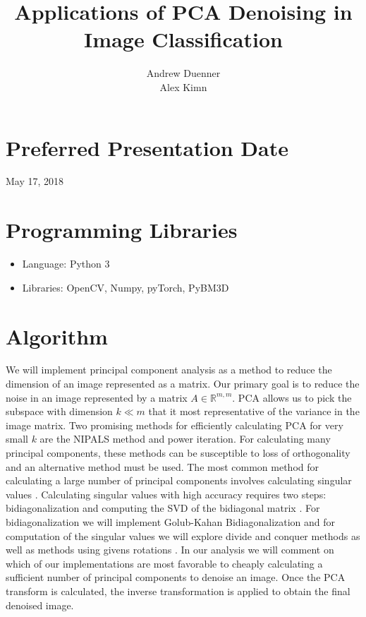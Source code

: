 \documentclass[11pt]{article} %
\title{Applications of PCA Denoising in Image Classification}
\author{Andrew Duenner \\ Alex Kimn}
\begin{document}
\maketitle

\section*{Preferred Presentation Date}
May 17, 2018
\section*{Programming Libraries}
\begin{itemize}
  \item Language: Python 3
  \item Libraries: OpenCV, Numpy, pyTorch, PyBM3D
\end{itemize}

\section*{Algorithm}
We will implement principal component analysis as a method to reduce the dimension of an image represented as a matrix. Our primary goal is to reduce the noise in an image represented by a matrix $A \in \mathbb{R}^{m,m} $. PCA allows us to pick the subspace  with dimension $k\ll m$ that it most representative of the variance  in the image matrix. 
Two promising methods for efficiently calculating PCA for very small $k$ are the NIPALS method \cite{GELADI19861} and power iteration.  For calculating many principal components, these methods can be susceptible to loss of orthogonality and an alternative method must be used. The most common method for calculating a large number of principal components involves calculating singular values \cite{trefethen1997numerical} \cite{cline2006computation}. 
Calculating singular values with high accuracy requires two steps: bidiagonalization and computing the SVD of the bidiagonal matrix \cite{trefethen1997numerical}. For bidiagonalization we will implement Golub-Kahan Bidiagonalization \cite{trefethen1997numerical} and for computation of the singular values we will explore divide and conquer methods as well as methods using givens rotations \cite{cline2006computation}. In our analysis we will comment on which of our implementations are most favorable to cheaply calculating a sufficient number of principal components to denoise an image. Once the PCA transform is calculated, the inverse transformation is applied to obtain the final denoised image.
\end{document}
